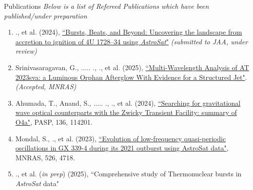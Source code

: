 \begin{rSection}{Publications} 
\hspace{-1em} {\textit{Below is a list of Refereed Publications which have been published/under preparation}}
\vspace{-0.5em}
\begin{enumerate}[itemsep=-0.5em, leftmargin=0.5em] %
    \item \me., et al. (2024), {\href{http://arxiv.org/abs/2412.06644}{``Bursts, Beats, and Beyond: Uncovering the landscape from accretion to ignition of 4U 1728--34 using \textit{AstroSat}"}} \textit{(submitted to JAA, under review)}
    \item Srinivasaragavan, G., ..... ., \me., et al. (2025), {\href{https://arxiv.org/abs/2501.03337}{``Multi-Wavelength Analysis of AT 2023sva: a Luminous Orphan Afterglow With Evidence for a Structured Jet"}}. \textit{(Accepted, MNRAS)}
    \item Ahumada, T., Anand, S., ..... ., \me ., et al. (2024), {\href{https://iopscience.iop.org/article/10.1088/1538-3873/ad8265}{``Searching for gravitational wave optical counterparts with the Zwicky Transient Facility: summary of O4a"}}, PASP, 136, 114201.
    \item Mondal, S., \me., et al. (2023), {\href{https://ui.adsabs.harvard.edu/link_gateway/2023MNRAS.526.4718M/doi:10.1093/mnras/stad3079}{``Evolution of low-frequency quasi-periodic oscillations in GX 339-4 during its 2021 outburst using AstroSat data"}}, MNRAS, 526, 4718. 
    \item \me., et al. (\textit{in prep}) (2025), {``Comprehensive study of Thermonuclear bursts in \textit{AstroSat} data"}
\end{enumerate}


\end{rSection}
